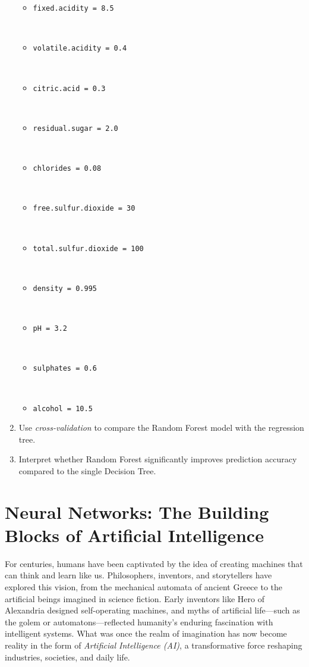 \documentclass[
]{book}
\newcommand{\passthrough}[1]{#1}
\providecommand{\tightlist}{%
  \setlength{\itemsep}{0pt}\setlength{\parskip}{0pt}}
\theoremstyle{definition}
\theoremstyle{definition}
\theoremstyle{definition}
\theoremstyle{definition}
\theoremstyle{remark}
\begin{document}
\begin{enumerate}
  \begin{itemize}
  \tightlist
  \item
    \passthrough{\lstinline!fixed.acidity = 8.5!}\strut \\
  \item
    \passthrough{\lstinline!volatile.acidity = 0.4!}\strut \\
  \item
    \passthrough{\lstinline!citric.acid = 0.3!}\strut \\
  \item
    \passthrough{\lstinline!residual.sugar = 2.0!}\strut \\
  \item
    \passthrough{\lstinline!chlorides = 0.08!}\strut \\
  \item
    \passthrough{\lstinline!free.sulfur.dioxide = 30!}\strut \\
  \item
    \passthrough{\lstinline!total.sulfur.dioxide = 100!}\strut \\
  \item
    \passthrough{\lstinline!density = 0.995!}\strut \\
  \item
    \passthrough{\lstinline!pH = 3.2!}\strut \\
  \item
    \passthrough{\lstinline!sulphates = 0.6!}\strut \\
  \item
    \passthrough{\lstinline!alcohol = 10.5!}
  \end{itemize}
\item
  Use \emph{cross-validation} to compare the Random Forest model with the regression tree.\\
\item
  Interpret whether Random Forest significantly improves prediction accuracy compared to the single Decision Tree.
\end{enumerate}

\chapter{Neural Networks: The Building Blocks of Artificial Intelligence}\label{chapter-nn}

For centuries, humans have been captivated by the idea of creating machines that can think and learn like us. Philosophers, inventors, and storytellers have explored this vision, from the mechanical automata of ancient Greece to the artificial beings imagined in science fiction. Early inventors like Hero of Alexandria designed self-operating machines, and myths of artificial life---such as the golem or automatons---reflected humanity's enduring fascination with intelligent systems. What was once the realm of imagination has now become reality in the form of \emph{Artificial Intelligence (AI)}, a transformative force reshaping industries, societies, and daily life.
\end{document}
